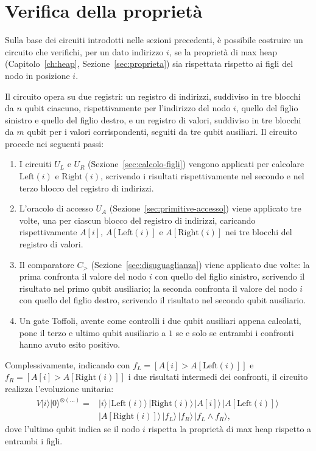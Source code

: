 \section{Verifica della proprietà \label{sec:verifica-proprieta}}
Sulla base dei circuiti introdotti nelle sezioni precedenti, è possibile costruire un circuito che verifichi, per un dato indirizzo $i$, se la proprietà di max heap (Capitolo~\ref{ch:heap}, Sezione~\ref{sec:proprieta}) sia rispettata rispetto ai figli del nodo in posizione $i$.

Il circuito opera su due registri: un registro di indirizzi, suddiviso in tre blocchi da $n$ qubit ciascuno, rispettivamente per l'indirizzo del nodo $i$, quello del figlio sinistro e quello del figlio destro, e un registro di valori, suddiviso in tre blocchi da $m$ qubit per i valori corrispondenti, seguiti da tre qubit ausiliari. Il circuito procede nei seguenti passi:
\begin{enumerate}
  \item I circuiti $U_L$ e $U_R$ (Sezione~\ref{sec:calcolo-figli}) vengono applicati per calcolare $\text{Left}(i)$ e $\text{Right}(i)$, scrivendo i risultati rispettivamente nel secondo e nel terzo blocco del registro di indirizzi.
  \item L'oracolo di accesso $U_A$ (Sezione~\ref{sec:primitive-accesso}) viene applicato tre volte, una per ciascun blocco del registro di indirizzi, caricando rispettivamente $A[i]$, $A[\text{Left}(i)]$ e $A[\text{Right}(i)]$ nei tre blocchi del registro di valori.
  \item Il comparatore $C_>$ (Sezione~\ref{sec:disuguaglianza}) viene applicato due volte: la prima confronta il valore del nodo $i$ con quello del figlio sinistro, scrivendo il risultato nel primo qubit ausiliario; la seconda confronta il valore del nodo $i$ con quello del figlio destro, scrivendo il risultato nel secondo qubit ausiliario.
  \item Un gate Toffoli, avente come controlli i due qubit ausiliari appena calcolati, pone il terzo e ultimo qubit ausiliario a $1$ se e solo se entrambi i confronti hanno avuto esito positivo.
\end{enumerate}

Complessivamente, indicando con $f_L = [A[i] > A[\text{Left}(i)]]$ e $f_R = [A[i] > A[\text{Right}(i)]]$ i due risultati intermedi dei confronti, il circuito realizza l'evoluzione unitaria:
\begin{equation}
  \begin{aligned}
    V |i\rangle |0\rangle^{\otimes(\ldots)} = {} & |i\rangle\, |\text{Left}(i)\rangle\, |\text{Right}(i)\rangle\, |A[i]\rangle\, |A[\text{Left}(i)]\rangle\, \\
                                                 & |A[\text{Right}(i)]\rangle\, |f_L\rangle\, |f_R\rangle\, \big|f_L \wedge f_R\big\rangle,
  \end{aligned}
\end{equation}
dove l'ultimo qubit indica se il nodo $i$ rispetta la proprietà di max heap rispetto a entrambi i figli.

